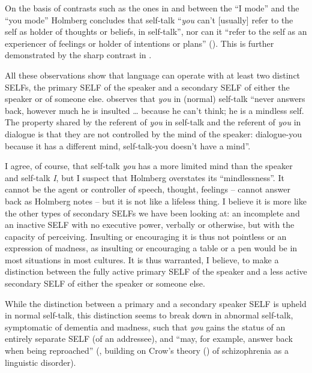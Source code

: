 \documentclass[output=paper]{LSP/langsci}
\begin{document}
\ea%
    \label{ex:Sigurdsson:24}
\z
\z

On the basis of contrasts such as the ones in  and  between the “I mode” and the “you mode” Holmberg concludes that self-talk “\textit{you} can’t [usually] refer to the self as holder of thoughts or beliefs, in self-talk”, nor can it “refer to the self as an experiencer of feelings or holder of intentions or plans” (\citeyear[59--60]{Holmberg2010yourself}). This is further demonstrated by the sharp contrast in .

\ea%
    \label{ex:Sigurdsson:25}
\z
\z

All these observations show that language can operate with at least two distinct SELFs, the primary SELF of the speaker and a secondary SELF of either the speaker or of someone else. \citet[60]{Holmberg2010yourself} observes that \textit{you} in (normal) self-talk “never answers back, however much he is insulted … because he can’t think; he is a mindless self. The property shared by the referent of \textit{you} in self-talk and the referent of \textit{you} in dialogue is that they are not controlled by the mind of the speaker: dialogue-you because it has a different mind, self-talk-you doesn’t have a mind”.

I agree, of course, that self-talk \textit{you} has a more limited mind than the speaker and self-talk \textit{I}, but I suspect that Holmberg overstates its “mindlessness”. It cannot be the agent or controller of speech, thought, feelings – cannot answer back as Holmberg notes – but it is not like a lifeless thing. I believe it is more like the other types of secondary SELFs we have been looking at: an incomplete and an inactive SELF with no executive power, verbally or otherwise, but with the capacity of perceiving. Insulting or encouraging it is thus not pointless or an expression of madness, as insulting or encouraging a table or a pen would be in most situations in most cultures. It is thus warranted, I believe, to make a distinction between the fully active primary SELF of the speaker and a less active secondary SELF of either the speaker or someone else.

While the distinction between a primary and a secondary speaker SELF is upheld in normal self-talk, this distinction seems to break down in abnormal self-talk, symptomatic of dementia and madness, such that \textit{you} gains the status of an entirely separate SELF (of an addressee), and “may, for example, answer back when being reproached” (\citealt[63]{Holmberg2010yourself}, building on Crow’s theory (\citeyear{Crow1998,Crow2004}) of schizophrenia as a linguistic disorder).
\end{document}
